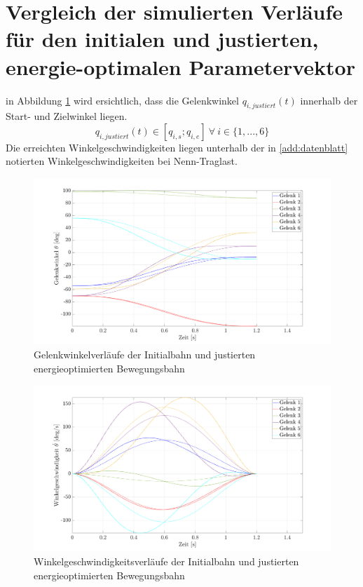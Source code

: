 \section{Vergleich der simulierten Verläufe für den initialen und justierten, energie-optimalen Parametervektor}
\label{acc:optupjust}
%
in Abbildung \ref{fig:posoptfinal} wird ersichtlich, dass die Gelenkwinkel $q_{i,justiert}(t)$ innerhalb der Start- und Zielwinkel liegen.
%
\begin{equation}
	q_{i,justiert}(t) \in [q_{i,s};q_{i,e}] ~\forall~ i \in \{1,...,6\}
\end{equation}
%
Die erreichten Winkelgeschwindigkeiten liegen unterhalb der in \ref{add:datenblatt} notierten Winkelgeschwindigkeiten bei Nenn-Traglast.
%
\begin{figure}[tbph]
	\centering
	\includegraphics[width=1\linewidth]{images/Optimierungsergebnisse_up/posoptfinal}
	\caption{Gelenkwinkelverläufe der Initialbahn und justierten energieoptimierten Bewegungsbahn}
	\label{fig:posoptfinal}
\end{figure}
%
\begin{figure}[tbph]
	\centering
	\includegraphics[width=1\linewidth]{images/Optimierungsergebnisse_up/veloptfinal}
	\caption{Winkelgeschwindigkeitsverläufe der Initialbahn und justierten energieoptimierten Bewegungsbahn}
	\label{fig:veloptfinal}
\end{figure}
